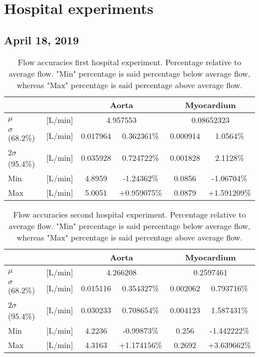\section{Hospital experiments}
\subsection*{April 18, 2019}
\begin{table}[H]
\caption{Flow accuracies first hospital experiment. Percentage relative to average flow. "Min" percentage is said percentage below average flow, whereas "Max" percentage is said percentage above average flow.}
\label{tab:hospital_first}
\begin{tabular}{lc|cccc|}
					&    		& \multicolumn{2}{c}{Aorta} 					& \multicolumn{2}{c}{Myocardium} 		\\ \hline
$\mu$ 		& [L/min]   & \multicolumn{2}{c}{4.957553 } & \multicolumn{2}{c|}{0.08652323} \\
$\sigma$ (68.2\%) 	& [L/min]	& 0.017964 & 0.362361\%		& 0.000914 & 1.0564\%                          	\\
2$\sigma$ (95.4\%) 	& [L/min] 	& 0.035928 & 0.724722\%		& 0.001828 &  2.1128\%                         				\\
Min 				& [L/min]  	& 4.8959 & -1.24362\% &  0.0856 & -1.06704\% \\
Max 				& [L/min]	& 5.0051 & +0.959075\%  & 0.0879 & +1.591209\% \\ \cline{3-6} 
\end{tabular}
\end{table}

\begin{table}[H]
\caption{Flow accuracies second hospital experiment. Percentage relative to average flow. "Min" percentage is said percentage below average flow, whereas "Max" percentage is said percentage above average flow.}
\label{tab:hospital_second}
\begin{tabular}{lc|cccc|}
					&    		& \multicolumn{2}{c}{Aorta} 					& \multicolumn{2}{c}{Myocardium} 		\\ \hline
$\mu$ 		& [L/min]   & \multicolumn{2}{c}{4.266208 } & \multicolumn{2}{c|}{0.2597461} \\
$\sigma$ (68.2\%) 	& [L/min]	& 0.015116 & 0.354327\%		& 0.002062 & 0.793716\%                          	\\
2$\sigma$ (95.4\%) 	& [L/min] 	& 0.030233 & 0.708654\%		& 0.004123 &  1.587431\%                         				\\
Min 				& [L/min]  	& 4.2236 & -0.99873\% &  0.256 & -1.442222\% \\
Max 				& [L/min]	& 4.3163 & +1.174156\%  & 0.2692 & +3.639662\% \\ \cline{3-6} 
\end{tabular}
\end{table}

